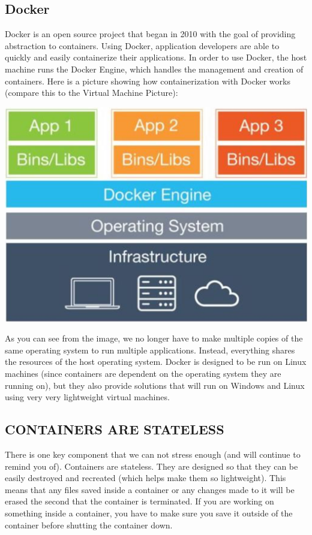 \subsection{Docker}
Docker is an open source project that began in 2010 with the goal of providing abstraction to containers. Using Docker, application developers are able to quickly and easily containerize their applications. In order to use Docker, the host machine runs the Docker Engine, which handles the management and creation of containers. Here is a picture showing how containerization with Docker works (compare this to the Virtual Machine Picture):
\begin{center}
    \includegraphics[scale=0.2]{virtualmachine2.png}
\end{center}
As you can see from the image, we no longer have to make multiple copies of the same operating system to run multiple applications. Instead, everything shares the resources of the host operating system.
Docker is designed to be run on Linux machines (since containers are dependent on the operating system they are running on), but they also provide solutions that will run on Windows and Linux using very very lightweight virtual machines.

\subsection{CONTAINERS ARE STATELESS}
There is one key component that we can not stress enough (and will continue to remind you of). Containers are stateless. They are designed so that they can be easily destroyed and recreated (which helps make them so lightweight). This means that any files saved inside a container or any changes made to it will be erased the second that the container is terminated. If you are working on something inside a container, you have to make sure you save it outside of the container before shutting the container down.





